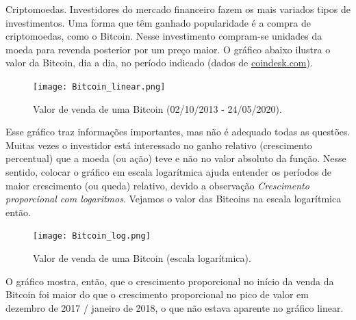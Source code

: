 \begin{example}{Criptomoedas.}
Investidores do mercado financeiro fazem os mais variados tipos de investimentos. Uma forma que têm ganhado popularidade é a compra de criptomoedas, como o Bitcoin. Nesse investimento compram-se unidades da moeda para revenda posterior por um preço maior. O gráfico abaixo ilustra o valor da Bitcoin, dia a dia, no período indicado (dados de \url{coindesk.com}).

\begin{figure}[H]
\centering

\texttt{[image: Bitcoin\_linear.png]}
\caption{Valor de venda de uma Bitcoin (02/10/2013 - 24/05/2020).}\label{bitcoinlinear}
\end{figure}

Esse gráfico traz informações importantes, mas não é adequado todas as questões. Muitas vezes o investidor está interessado no ganho relativo (crescimento percentual) que a moeda (ou ação) teve e não no valor absoluto da função. Nesse sentido, colocar o gráfico em escala logarítmica ajuda entender os períodos de maior crescimento (ou queda) relativo, devido a observação \textit{Crescimento proporcional com logaritmos}. Vejamos o valor das Bitcoins na escala logarítmica então. 

\begin{figure}[H]
\centering

\texttt{[image: Bitcoin\_log.png]}

\caption{Valor de venda de uma Bitcoin (escala logarítmica).}\label{bitcoinlog}
\end{figure}

O gráfico mostra, então, que o crescimento proporcional no início da venda da Bitcoin foi maior do que o crescimento proporcional no pico de valor em dezembro de 2017 / janeiro de 2018, o que não estava aparente no gráfico linear.
\end{example}

